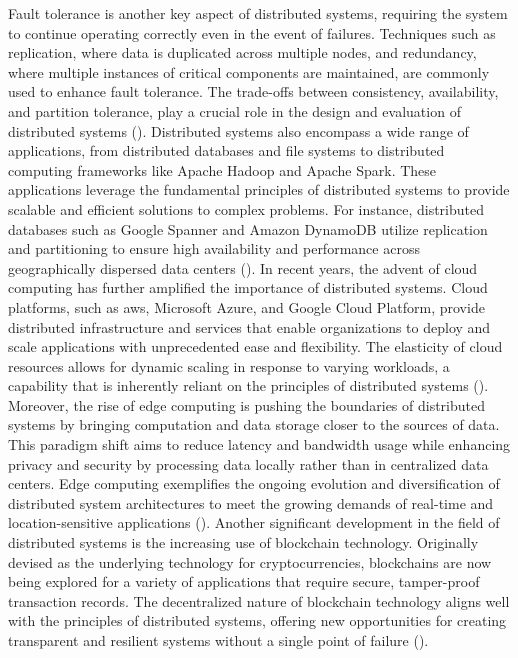Fault tolerance is another key aspect of distributed systems, requiring the system to continue operating correctly even in the event of failures. Techniques such as replication, where data is duplicated across multiple nodes, and redundancy, where multiple instances of critical components are maintained, are commonly used to enhance fault tolerance.
The trade-offs between consistency, availability, and partition tolerance, play a crucial role in the design and evaluation of distributed systems (\cite{vogels2009}).
Distributed systems also encompass a wide range of applications, from distributed databases and file systems to distributed computing frameworks like Apache Hadoop and Apache Spark.
These applications leverage the fundamental principles of distributed systems to provide scalable and efficient solutions to complex problems.
For instance, distributed databases such as Google Spanner and Amazon DynamoDB utilize replication and partitioning to ensure high availability and performance across geographically dispersed data centers (\cite{dean2008mapreduce}).
In recent years, the advent of cloud computing has further amplified the importance of distributed systems.
Cloud platforms, such as \gls{aws}, Microsoft Azure, and Google Cloud Platform, provide distributed infrastructure and services that enable organizations to deploy and scale applications with unprecedented ease and flexibility.
The elasticity of cloud resources allows for dynamic scaling in response to varying workloads, a capability that is inherently reliant on the principles of distributed systems (\cite{distributed-systems}).
Moreover, the rise of edge computing is pushing the boundaries of distributed systems by bringing computation and data storage closer to the sources of data.
This paradigm shift aims to reduce latency and bandwidth usage while enhancing privacy and security by processing data locally rather than in centralized data centers.
Edge computing exemplifies the ongoing evolution and diversification of distributed system architectures to meet the growing demands of real-time and location-sensitive applications (\cite{coulouris2005distributed}).
Another significant development in the field of distributed systems is the increasing use of blockchain technology.
Originally devised as the underlying technology for cryptocurrencies, blockchains are now being explored for a variety of applications that require secure, tamper-proof transaction records.
The decentralized nature of blockchain technology aligns well with the principles of distributed systems, offering new opportunities for creating transparent and resilient systems without a single point of failure (\cite{distributed-systems}).
